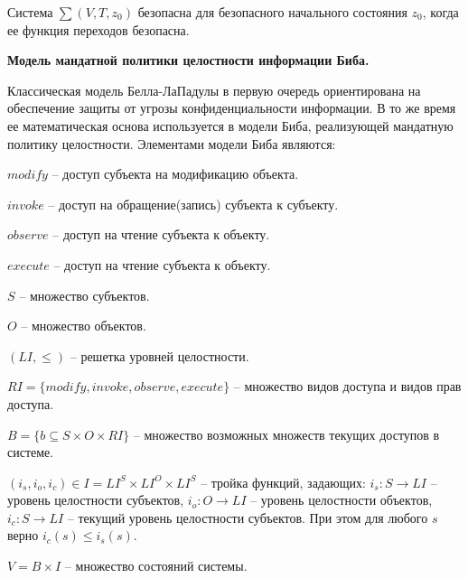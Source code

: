 \begin{proofs}[БТБ]
	Система $\sum (V,T,z_0)$ безопасна для безопасного начального состояния $z_0$, когда ее функция переходов безопасна.
\end{proofs}

\textbf{Модель мандатной политики целостности информации Биба.}

Классическая модель Белла-ЛаПадулы в первую очередь ориентирована на обеспечение защиты от угрозы конфиденциальности информации. В то же время ее математическая основа используется в модели Биба, 
реализующей мандатную политику целостности. Элементами модели Биба являются:
\begin{enumerate*}
	\item $modify$ -- доступ субъекта на модификацию объекта.
	\item $invoke$ -- доступ на обращение(запись) субъекта к субъекту.
	\item $observe$ -- доступ на чтение субъекта к объекту.
	\item $execute$ -- доступ на чтение субъекта к объекту.
	\item $S$ -- множество субъектов.
	\item $O$ -- множество объектов.
	\item $(LI, \leqslant)$ -- решетка уровней целостности.
	\item $RI = \{modify, invoke, observe, execute\}$ -- множество видов доступа и видов прав доступа.
	\item $B = \{b \subseteq S \times O \times RI\}$ -- множество возможных множеств текущих доступов в системе.
	\item $(i_s, i_o, i_c) \in I = LI^S \times LI^O \times LI^S$ -- тройка функций, задающих: $i_s : S \to LI$ -- уровень целостности субъектов, $i_o : O \to LI$ -- уровень целостности объектов, 
			$i_c : S \to LI$ -- текущий уровень целостности субъектов. При этом для любого $s$ верно $i_c(s) \leqslant i_s(s)$.
	\item $V=B \times I$ -- множество состояний системы.
\end{enumerate*}
\newpage









